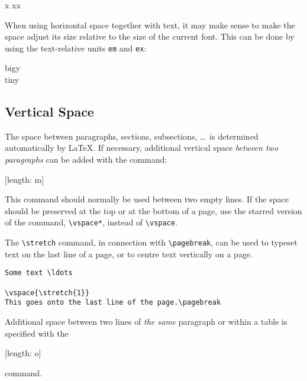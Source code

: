 \begin{example}
x
xx
\end{example}

When using horizontal space together with text, it may make sense to make
the space adjust its size relative to the size of the current font.
This can be done by using the text-relative units \texttt{em} and
\texttt{ex}:

\begin{example}
{\Large{}big\hspace{1em}y}\\
{\tiny{}tin\hspace{1em}y}
\end{example}

\subsection{Vertical Space}
The space between paragraphs, sections, subsections, \ldots\ is
determined automatically by \LaTeX. If necessary, additional vertical
space \emph{between two paragraphs} can be added with the command:
\begin{lscommand}
  [length: m]
\end{lscommand}

This command should normally be used between two empty lines.  If the
space should be preserved at the top or at the bottom of a page, use
the starred version of the command, \verb|\vspace*|, instead of \verb|\vspace|.

The \verb|\stretch| command, in connection with \verb|\pagebreak|, can
be used to typeset text on the last line of a page, or to centre text
vertically on a page.
\begin{code}
\begin{verbatim}
Some text \ldots

\vspace{\stretch{1}}
This goes onto the last line of the page.\pagebreak
\end{verbatim}
\end{code}

Additional space between two lines of \emph{the same} paragraph or
within a table is specified with the
\begin{lscommand}
  \csi{\bs}[length: o]
\end{lscommand}
\noindent command.

